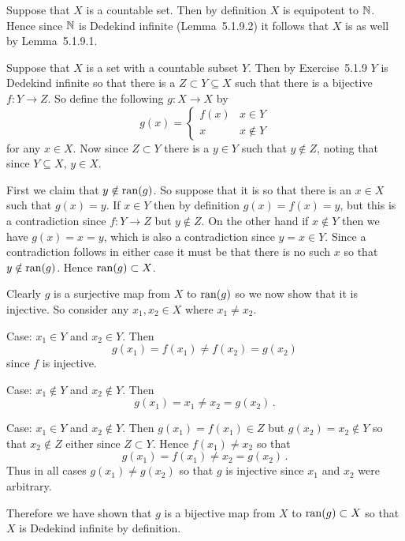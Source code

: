\begin{solution}
    \mainprob
    
	Suppose that $X$ is a countable set.
    Then by definition $X$ is equipotent to $\mathbb{N}$.
    Hence since $\mathbb{N}$ is Dedekind infinite (Lemma~5.1.9.2) it follows that $X$ is as well by Lemma~5.1.9.1.
\end{solution}


\begin{solution}
	Suppose that $X$ is a set with a countable subset $Y$.
    Then by Exercise~5.1.9 $Y$ is Dedekind infinite so that there is a $Z \subset Y \subseteq X$ such that there is a bijective $f : Y \to Z$.
    So define the following $g: X \to X$ by
    $$
    g(x) = \begin{cases}
    	f(x) & x \in Y \\
        x & x \notin Y
    \end{cases}
    $$
    for any $x \in X$.
    Now since $Z \subset Y$ there is a $y \in Y$ such that $y \notin Z$, noting that since $Y \subseteq X$, $y \in X$.

    First we claim that $y \notin \mathrm{ran}(g)$.
    So suppose that it is so that there is an $x \in X$ such that $g(x) = y$.
    If $x \in Y$ then by definition $g(x) = f(x) = y$, but this is a contradiction since $f : Y \to Z$ but $y \notin Z$.
    On the other hand if $x \notin Y$ then we have $g(x) = x = y$, which is also a contradiction since $y = x \in Y$.
    Since a contradiction follows in either case it must be that there is no such $x$ so that $y \notin \mathrm{ran}(g)$.
    Hence $\mathrm{ran}(g) \subset X$.

    Clearly $g$ is a surjective map from $X$ to $\mathrm{ran}(g)$ so we now show that it is injective.
    So consider any $x_1, x_2 \in X$ where $x_1 \neq x_2$.

    Case: $x_1 \in Y$ and $x_2 \in Y$.
    Then
    $$
    g(x_1) = f(x_1) \neq f(x_2) = g(x_2)
    $$
    since $f$ is injective.

    Case: $x_1 \notin Y$ and $x_2 \notin Y$.
    Then
    $$
    g(x_1) = x_1 \neq x_2 = g(x_2) \,.
    $$

    Case: $x_1 \in Y$ and $x_2 \notin Y$.
    Then $g(x_1) = f(x_1) \in Z$ but $g(x_2) = x_2 \notin Y$ so that  $x_2 \notin Z$ either since $Z \subset Y$.
    Hence $f(x_1) \neq x_2$ so that
    $$
    g(x_1) = f(x_1) \neq x_2 = g(x_2) \,.
    $$
    Thus in all cases $g(x_1) \neq g(x_2)$ so that $g$ is injective since $x_1$ and $x_2$ were arbitrary.

    Therefore we have shown that $g$ is a bijective map from $X$ to $\mathrm{ran}(g) \subset X$ so that $X$ is Dedekind infinite by definition.
\end{solution}

